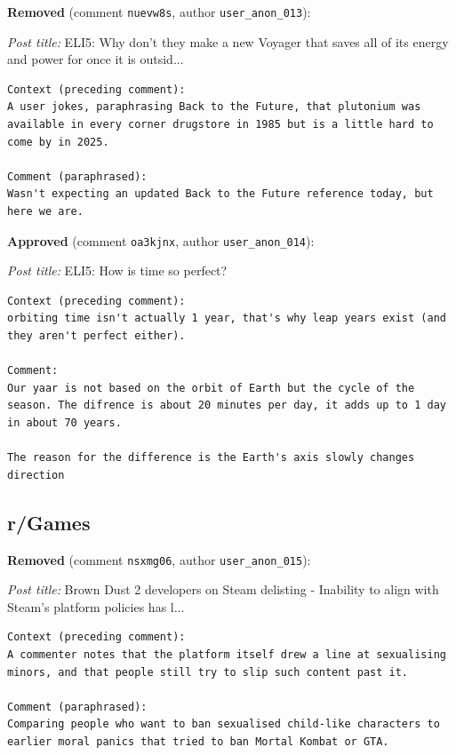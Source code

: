 \noindent\textbf{Removed} (comment \texttt{nuevw8s}, author \texttt{user\_anon\_013}):

\noindent\emph{Post title:} ELI5: Why don't they make a new Voyager that saves all of its energy and power for once it is outsid...

\begin{lstlisting}
Context (preceding comment):
A user jokes, paraphrasing Back to the Future, that plutonium was available in every corner drugstore in 1985 but is a little hard to come by in 2025.

Comment (paraphrased):
Wasn't expecting an updated Back to the Future reference today, but here we are.
\end{lstlisting}

\noindent\textbf{Approved} (comment \texttt{oa3kjnx}, author \texttt{user\_anon\_014}):

\noindent\emph{Post title:} ELI5: How is time so perfect?

\begin{lstlisting}
Context (preceding comment):
orbiting time isn't actually 1 year, that's why leap years exist (and they aren't perfect either).

Comment:
Our yaar is not based on the orbit of Earth but the cycle of the season. The difrence is about 20 minutes per day, it adds up to 1 day in about 70 years.

The reason for the difference is the Earth's axis slowly changes direction
\end{lstlisting}


\subsection*{r/Games}

\noindent\textbf{Removed} (comment \texttt{nsxmg06}, author \texttt{user\_anon\_015}):

\noindent\emph{Post title:} Brown Dust 2 developers on Steam delisting - Inability to align with Steam's platform policies has l...

\begin{lstlisting}
Context (preceding comment):
A commenter notes that the platform itself drew a line at sexualising minors, and that people still try to slip such content past it.

Comment (paraphrased):
Comparing people who want to ban sexualised child-like characters to earlier moral panics that tried to ban Mortal Kombat or GTA.
\end{lstlisting}

